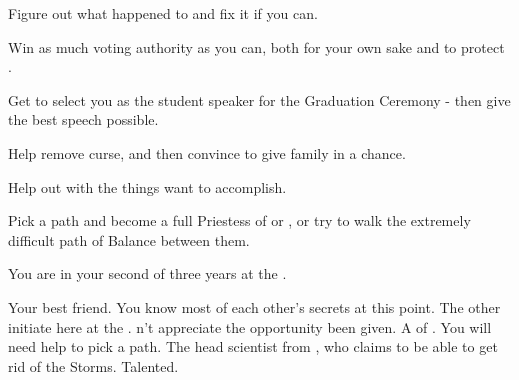 \documentclass[char]{GL2020}
\begin{document}
\begin{itemz}[Goals]
	\item Figure out what happened to \cLoud{} and fix it if you can.
	\item Win as much voting authority as you can, both for your own sake and to protect \pShip{}.
	\item Get \cBeetle{} to select you as the student speaker for the Graduation Ceremony - then give the best speech possible.
	\item Help \cInitiate{} remove \cInitiate{\their} curse, and then convince \cInitiate{\them} to give \cInitiate{\their} family in \pFarm{} a chance.
	\item Help \cHeir{} out with the things \cHeir{\they} want to accomplish.
	\item Pick a path and become a full Priestess of \cEbb{} or \cFlow{}, or try to walk the extremely difficult path of Balance between them.
\end{itemz}

\begin{itemz}[Notes]
	\item You are in your second of three years at the \pSchool{}.
\end{itemz}

\begin{contacts}
	\contact{\cHeir{}} Your best friend. You know most of each other’s secrets at this point.
	\contact{\cInitiate{}} The other \pShippies{} initiate here at the \pSc{}. \cInitiate{\They} \cInitiate{\does}n't appreciate the opportunity \cInitiate{\they}  \cInitiate{\have} been given.
	\contact{\cFlowPriest{}} A \cFlowPriest{\cleric} of \cFlow{}. You will need \cFlowPriest{\their} help to pick a path.
\contact{\cHeadScientist{}} The head scientist from \pTech{}, who claims to be able to get rid of the Storms. Talented.
\end{contacts}
\end{document}
